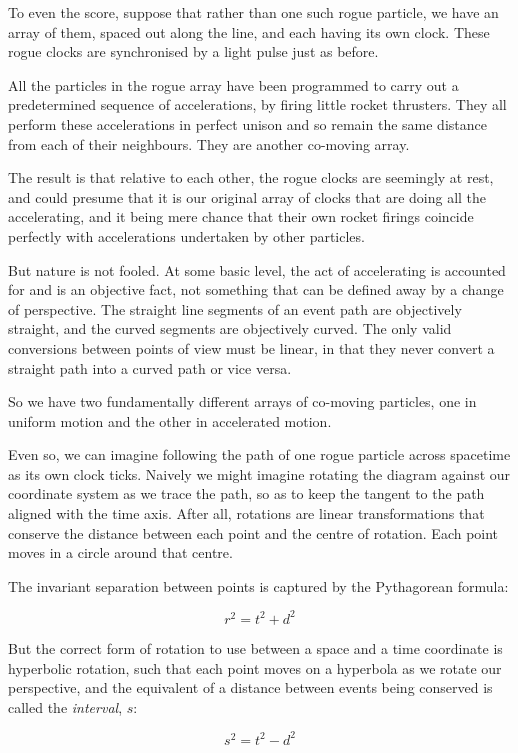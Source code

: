 To even the score, suppose that rather than one such rogue particle, we have an array of them, spaced out along the line, and each having its own clock. These rogue clocks are synchronised by a light pulse just as before.

All the particles in the rogue array have been programmed to carry out a predetermined sequence of accelerations, by firing little rocket thrusters. They all perform these accelerations in perfect unison and so remain the same distance from each of their neighbours. They are another co-moving array.

The result is that relative to each other, the rogue clocks are seemingly at rest, and could presume that it is our original array of clocks that are doing all the accelerating, and it being mere chance that their own rocket firings coincide perfectly with accelerations undertaken by other particles.

But nature is not fooled. At some basic level, the act of accelerating is accounted for and is an objective fact, not something that can be defined away by a change of perspective. The straight line segments of an event path are objectively straight, and the curved segments are objectively curved. The only valid conversions between points of view must be linear, in that they never convert a straight path into a curved path or vice versa.

So we have two fundamentally different arrays of co-moving particles, one in uniform motion and the other in accelerated motion.

Even so, we can imagine following the path of one rogue particle across spacetime as its own clock ticks. Naively we might imagine rotating the diagram against our coordinate system as we trace the path, so as to keep the tangent to the path aligned with the time axis. After all, rotations are linear transformations that conserve the distance between each point and the centre of rotation. Each point moves in a circle around that centre.

The invariant separation between points is captured by the Pythagorean formula:

$$r^2 = t^2 + d^2$$

But the correct form of rotation to use between a space and a time coordinate is hyperbolic rotation, such that each point moves on a hyperbola as we rotate our perspective, and the equivalent of a distance between events being conserved is called the \textit{interval}, $s$:

$$s^2 = t^2 - d^2$$

